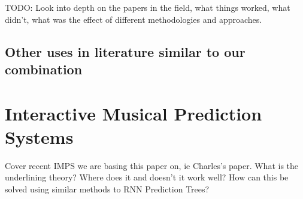 TODO: Look into depth on the papers in the field, what things worked, what didn't, what was the effect of different methodologies and approaches.

\subsection{Other uses in literature similar to our combination}

\section{Interactive Musical Prediction Systems}
Cover recent IMPS we are basing this paper on, ie Charles's paper. What is the underlining theory? Where does it and doesn't it work well? How can this be solved using similar methods to RNN Prediction Trees?

